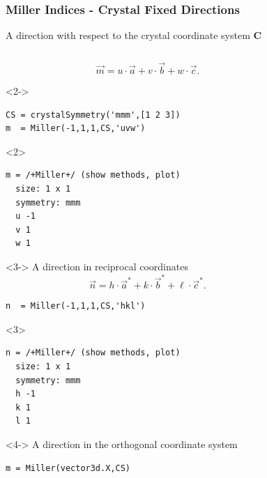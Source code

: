 \documentclass[compress]{beamer}
\begin{document}
\begin{frame}[fragile]
  \frametitle{Miller Indices - Crystal Fixed Directions}

  A direction with respect to the crystal coordinate system  $\mathbf C$

  \begin{columns}
    \begin{column}{7cm}

      \begin{overlayarea}{8cm}{8cm}

        \begin{equation*}
          \vec m = u \cdot \vec a+ v \cdot \vec b + w \cdot \vec c.
        \end{equation*}

    \begin{onlyenv}<2->
\begin{lstlisting}[style=input]
CS = crystalSymmetry('mmm',[1 2 3])
m  = Miller(-1,1,1,CS,'uvw')
\end{lstlisting}
\end{onlyenv}
\begin{onlyenv}<2>
\vspace{-.3cm}\begin{lstlisting}[style=output]
m = /+Miller+/ (show methods, plot)
  size: 1 x 1
  symmetry: mmm
  u -1
  v 1
  w 1
\end{lstlisting}
\end{onlyenv}

    \begin{onlyenv}<3->
A direction in reciprocal coordinates
\begin{equation*}
  \vec n = h \cdot \vec a^{*}+ k \cdot \vec b^{*} + \ell \cdot \vec c^{*}.
\end{equation*}
\begin{lstlisting}[style=input]
n  = Miller(-1,1,1,CS,'hkl')
\end{lstlisting}
\end{onlyenv}
\begin{onlyenv}<3>
  \vspace{-.3cm}
  \begin{lstlisting}[style=output]
n = /+Miller+/ (show methods, plot)
  size: 1 x 1
  symmetry: mmm
  h -1
  k 1
  l 1
\end{lstlisting}
\end{onlyenv}

\medskip

\begin{onlyenv}<4->
  A direction in the orthogonal coordinate system
  \begin{lstlisting}[style=input]
m = Miller(vector3d.X,CS)
\end{lstlisting}
\end{onlyenv}
\end{overlayarea}
\end{column}
    \begin{column}{4cm}


\end{column}
\end{columns}
\end{frame}
\end{document}
